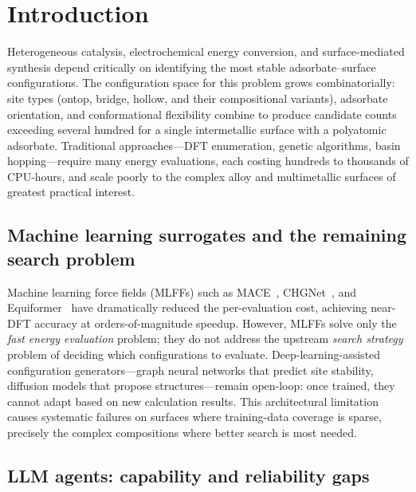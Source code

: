 \section{Introduction}

Heterogeneous catalysis, electrochemical energy conversion, and surface-mediated synthesis depend critically on identifying the most stable adsorbate--surface configurations.
The configuration space for this problem grows combinatorially: site types (ontop, bridge, hollow, and their compositional variants), adsorbate orientation, and conformational flexibility combine to produce candidate counts exceeding several hundred for a single intermetallic surface with a polyatomic adsorbate.
Traditional approaches---DFT enumeration, genetic algorithms, basin hopping---require many energy evaluations, each costing hundreds to thousands of CPU-hours, and scale poorly to the complex alloy and multimetallic surfaces of greatest practical interest.

\subsection{Machine learning surrogates and the remaining search problem}

Machine learning force fields (MLFFs) such as MACE~\cite{batatia2022mace}, CHGNet~\cite{deng2023chgnet}, and Equiformer~\cite{liao2023equiformerv2} have dramatically reduced the per-evaluation cost, achieving near-DFT accuracy at orders-of-magnitude speedup.
However, MLFFs solve only the \textit{fast energy evaluation} problem; they do not address the upstream \textit{search strategy} problem of deciding which configurations to evaluate.
Deep-learning-assisted configuration generators---graph neural networks that predict site stability, diffusion models that propose structures---remain open-loop: once trained, they cannot adapt based on new calculation results.
This architectural limitation causes systematic failures on surfaces where training-data coverage is sparse, precisely the complex compositions where better search is most needed.

\subsection{LLM agents: capability and reliability gaps}

